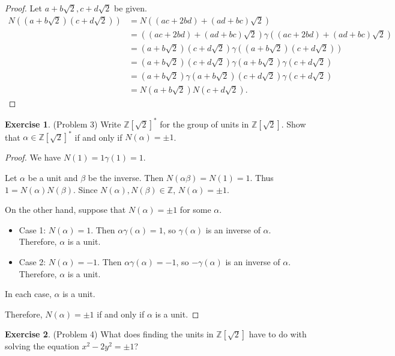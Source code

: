 \documentclass[12pt, psamsfonts]{amsart}
\theoremstyle{definition}
\newtheorem*{exer}{Exercise}
\theoremstyle{remark}
\numberwithin{equation}{section}
\begin{document}
\begin{proof}
  Let $a + b\sqrt{2}, c + d\sqrt{2}$ be given.
  \begin{align*}
    N((a + b\sqrt{2})(c + d\sqrt{2}))
      &= N((ac + 2bd) + (ad + bc)\sqrt{2}) \\
      &= ((ac + 2bd) + (ad + bc)\sqrt{2})\gamma((ac + 2bd) + (ad + bc)\sqrt{2}) \\
      &= (a + b\sqrt{2})(c + d\sqrt{2})\gamma((a + b\sqrt{2})(c + d\sqrt{2})) \\
      &= (a + b\sqrt{2})(c + d\sqrt{2})\gamma(a + b\sqrt{2})\gamma(c + d\sqrt{2}) \\
      &= (a + b\sqrt{2})\gamma(a + b\sqrt{2})(c + d\sqrt{2})\gamma(c + d\sqrt{2}) \\
      &= N(a + b\sqrt{2})N(c + d\sqrt{2}).
  \end{align*}
\end{proof}

\begin{exer}{(Problem 3)}
  Write $\mathbb{Z}[\sqrt{2}]^*$ for the group of units in $\mathbb{Z}[\sqrt{2}]$.
  Show that $\alpha \in \mathbb{Z}[\sqrt{2}]^*$ if and only if $N(\alpha) = \pm 1$.
\end{exer}

\begin{proof}
  We have $N(1) = 1\gamma(1) = 1$.

  Let $\alpha$ be a unit and $\beta$ be the inverse.
  Then $N(\alpha\beta) = N(1) = 1$.
  Thus $1 = N(\alpha)N(\beta)$.
  Since $N(\alpha), N(\beta) \in \mathbb{Z}$, $N(\alpha) = \pm 1$.

  On the other hand, suppose that $N(\alpha) = \pm 1$ for some $\alpha$.
  \begin{itemize}
    \item
      Case 1: $N(\alpha) = 1$. 
      Then $\alpha\gamma(\alpha) = 1$, so $\gamma(\alpha)$ is an inverse of $\alpha$.
      Therefore, $\alpha$ is a unit.
    \item
      Case 2: $N(\alpha) = -1$. 
      Then $\alpha\gamma(\alpha) = -1$, so $-\gamma(\alpha)$ is an inverse of $\alpha$.
      Therefore, $\alpha$ is a unit.
  \end{itemize}
  In each case, $\alpha$ is a unit.

  Therefore, $N(\alpha) = \pm 1$ if and only if $\alpha$ is a unit.
\end{proof}

\begin{exer}{(Problem 4)}
  What does finding the units in $\mathbb{Z}[\sqrt{2}]$ have to do with solving the equation $x^2 - 2y^2 = \pm 1$?
\end{exer}
\end{document}
